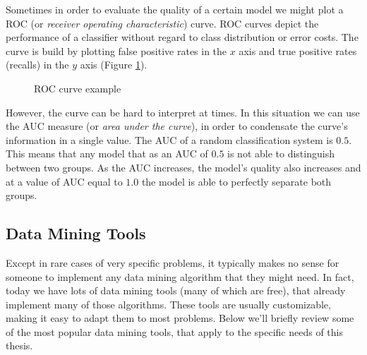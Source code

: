 Sometimes in order to evaluate the quality of a certain model we might plot a
ROC (or \textit{receiver operating characteristic}) curve. ROC curves depict the
performance of a classifier without regard to class distribution or error
costs. The curve is build by plotting false positive rates in the $x$ axis and
true positive rates (recalls) in the $y$ axis (Figure \ref{fig:roccurve}).

\begin{figure}[ht]
  \begin{center}
    \caption{ROC curve example}
    \label{fig:roccurve}
  \end{center}
\end{figure}

However, the curve can be hard to interpret at times. In this situation we can
use the AUC measure (or \textit{area under the curve}), in order to condensate
the curve's information in a single value. The AUC of a random classification
system is $0.5$. This means that any model that as an AUC of $0.5$ is not able
to distinguish between two groups. As the AUC increases, the model's quality
also increases and at a value of AUC equal to $1.0$ the model is able to
perfectly separate both groups.

\subsection{Data Mining Tools}\label{sec:mintools}

Except in rare cases of very specific problems, it typically makes no sense for
someone to implement any data mining algorithm that they might need. In fact,
today we have lots of data mining tools (many of which are free), that already
implement many of those algorithms. These tools are usually customizable, making
it easy to adapt them to most problems. Below we'll briefly review some of the
most popular data mining tools, that apply to the specific needs of this thesis.

